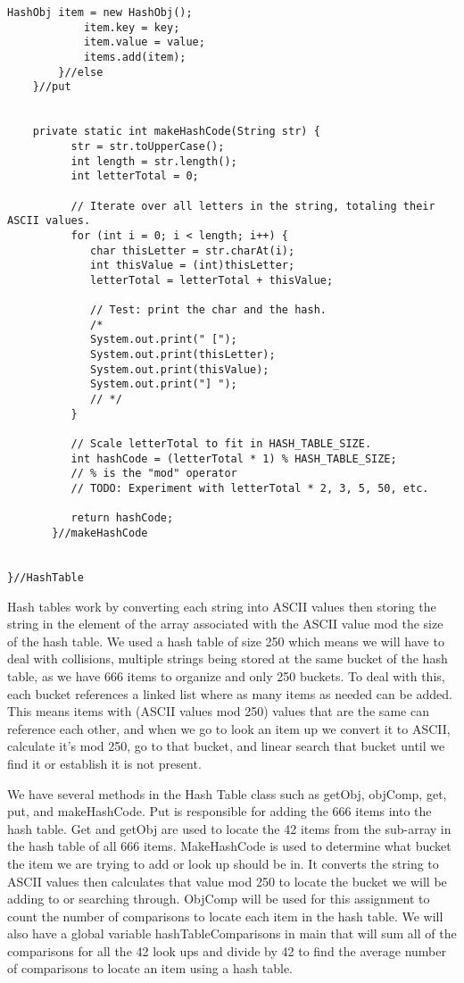 \documentclass{article}
\begin{document}
\begin{lstlisting}[frame =single,
backgroundcolor = \color{grey!12}]
			HashObj item = new HashObj();
			item.key = key;
			item.value = value;
			items.add(item);
		}//else
	}//put
	
	
	private static int makeHashCode(String str) {
	      str = str.toUpperCase();
	      int length = str.length();
	      int letterTotal = 0;

	      // Iterate over all letters in the string, totaling their ASCII values.
	      for (int i = 0; i < length; i++) {
	         char thisLetter = str.charAt(i);
	         int thisValue = (int)thisLetter;
	         letterTotal = letterTotal + thisValue;

	         // Test: print the char and the hash.
	         /*
	         System.out.print(" [");
	         System.out.print(thisLetter);
	         System.out.print(thisValue);
	         System.out.print("] ");
	         // */
	      }

	      // Scale letterTotal to fit in HASH_TABLE_SIZE.
	      int hashCode = (letterTotal * 1) % HASH_TABLE_SIZE; 
	      // % is the "mod" operator
	      // TODO: Experiment with letterTotal * 2, 3, 5, 50, etc.

	      return hashCode;
	   }//makeHashCode
	
	
}//HashTable
\end{lstlisting}
\large
Hash tables work by converting each string into ASCII values then storing the string in the element of the array associated with the ASCII value mod the size of the hash table. We used a hash table of size 250 which means we will have to deal with collisions, multiple strings being stored at the same bucket of the hash table, as we have 666 items to organize and only 250 buckets. To deal with this, each bucket references a linked list where as many items as needed can be added. This means items with (ASCII values mod 250) values that are the same can reference each other, and when we go to look an item up we convert it to ASCII, calculate it's mod 250, go to that bucket, and linear search that bucket until we find it or establish it is not present. 

We have several methods in the Hash Table class such as getObj, objComp, get, put, and makeHashCode. Put is responsible for adding the 666 items into the hash table. Get and getObj are used to locate the 42 items from the sub-array in the hash table of all 666 items. MakeHashCode is used to determine what bucket the item we are trying to add or look up should be in. It converts the string to ASCII values then calculates that value mod 250 to locate the bucket we will be adding to or searching through. ObjComp will be used for this assignment to count the number of comparisons to locate each item in the hash table. We will also have a global variable hashTableComparisons in main that will sum all of the comparisons for all the 42 look ups and divide by 42 to find the average number of comparisons to locate an item using a hash table. 
\end{document}
